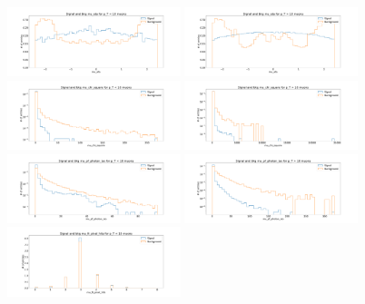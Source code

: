 \begin{figure}[!htb]
   \vspace*{0.3cm}
   \begin{center}
      \includegraphics[width=0.45\textwidth]{Figures/Muons/mu_eta_5.pdf}
      \includegraphics[width=0.45\textwidth]{Figures/Muons/mu_eta_10.pdf} \\
      \includegraphics[width=0.45\textwidth]{Figures/Muons/mu_chi_square_5.pdf}
      \includegraphics[width=0.45\textwidth]{Figures/Muons/mu_chi_square_10.pdf} \\
      \includegraphics[width=0.45\textwidth]{Figures/Muons/mu_pf_photon_iso_5.pdf}
      \includegraphics[width=0.45\textwidth]{Figures/Muons/mu_pf_photon_iso_10.pdf} \\
      \includegraphics[width=0.45\textwidth]{Figures/Muons/mu_N_pixel_hits_5.pdf}

\end{center}
\end{figure}
